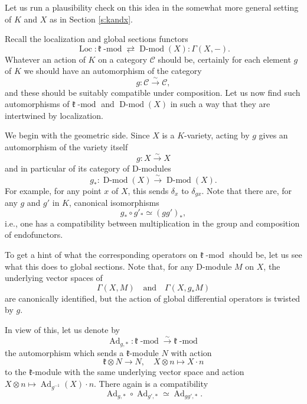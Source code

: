 \documentclass[10pt]{amsart}
\newcommand{\on}{\operatorname}
\renewcommand{\mod}{\on{-mod}}
\newcommand{\Dmod}{\on{D-mod}}
\theoremstyle{remark}
\newcommand{\fk}{\mathfrak{k}}
\numberwithin{equation}{section}
\newcommand{\sC}{\mathscr{C}}
\renewcommand{\mod}{\operatorname{-mod}}
\begin{document}
	
	\subsubsection{} Let us run a plausibility check on this idea in the 
	somewhat more general setting of $K$ and $X$ as in 
	Section \ref{s:kandx}. 
	
	Recall the localization and global sections functors
	\[
	     \on{Loc}: \fk\mod \rightleftarrows \Dmod(X): \Gamma(X, -).
	\]
	Whatever an action of $K$ on a category $\sC$ should be, certainly for each 
	element $g$ of $K$ we should have an automorphism of the category
	$$
	    g: \sC \xrightarrow{\sim}\sC,
	$$
	and these should be suitably compatible under composition. Let us 
	now find such automorphisms of $\fk\mod$ and $\Dmod(X)$ in such a way that they are intertwined by localization. 
	
	
	 We begin with the geometric side. Since $X$ is a $K$-variety, acting by 
	 $g$ gives an automorphism of the variety itself $$g: X 
	 \xrightarrow{\sim} X$$and in particular of its 
	 category of D-modules 
	 \[
	      g_*: \Dmod(X) \xrightarrow{\sim} \Dmod(X).
	 \]
	For example, for any point $x$ of $X$, this sends $\delta_x$ to 
	$\delta_{gx}$. Note that there are, for any $g$ and $g'$ in $K$, canonical 
	isomorphisms 
	\[
	     g_* \circ g'_* \simeq (gg')_*,
	\]
	i.e., one has a compatibility between multiplication in the group and 
	composition of endofunctors. 
	
	To get a hint of what the corresponding operators on $\fk\mod$ should be,  let us see what this does to global sections. Note that, for any D-module 
	 $M$ on $X$, the underlying vector spaces of 
	\[
	   \Gamma(X, M) \quad \text{and} \quad \Gamma(X, g_* M)
	\]
	are canonically identified, but the action of global differential operators 
	is twisted by $g$. 
	
	   In view of this, let us denote by 
	   \[
	       \on{Ad}_{g, *}: \fk\mod \xrightarrow{\sim} \fk\mod  
	   \]
	the automorphism which sends a $\fk$-module 
	$N$ with action $$\fk \otimes N \rightarrow N, \quad X \otimes n \mapsto X 
	\cdot n$$to the $\fk$-module with 
	the same underlying vector space and action $X \otimes n \mapsto 
	\on{Ad}_{g^{-1}}(X) \cdot n$. There again is a compatibility 
	\[
	   \on{Ad}_{g, *} \circ \on{Ad}_{g', *} \simeq \on{Ad}_{gg', *}.
	\]
	
\end{document}
